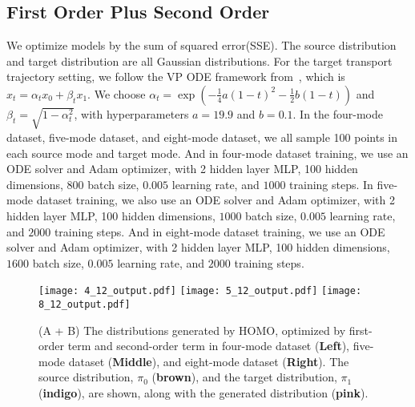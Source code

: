 \subsection{First Order Plus Second Order}\label{sec:app:first_order_plus_second_order}
We optimize models by the sum of squared error(SSE). The source distribution and target distribution are all Gaussian distributions. For the target transport trajectory setting, we follow the VP ODE framework from~\cite{rectified_flow}, which is $x_t = \alpha_t x_0 + \beta_t x_1$. We choose $\alpha_t = \exp(-\frac{1}{4} a(1-t)^2 - \frac{1}{2} b(1-t))$ and $\beta_t = \sqrt{1 - \alpha_t^2}$, with hyperparameters $a = 19.9$ and $b = 0.1$. In the four-mode dataset, five-mode dataset, and eight-mode dataset, we all sample 100 points in each source mode and target mode. And in four-mode dataset training, we use an ODE solver and Adam optimizer, with 2 hidden layer MLP, 100 hidden dimensions, $800$ batch size, $0.005$ learning rate, and $1000$ training steps. In five-mode dataset training, we also use an ODE solver and Adam optimizer, with 2 hidden layer MLP, 100 hidden dimensions, $1000$ batch size, $0.005$ learning rate, and $2000$ training steps. And in eight-mode dataset training, we use an ODE solver and Adam optimizer, with 2 hidden layer MLP, 100 hidden dimensions, $1600$ batch size, $0.005$ learning rate, and $2000$ training steps. 
\begin{figure}[!ht]
\centering
\texttt{[image: 4\_12\_output.pdf]}
\texttt{[image: 5\_12\_output.pdf]}
\texttt{[image: 8\_12\_output.pdf]}
\caption{
(A + B) The distributions generated by HOMO, optimized by first-order term and second-order term in four-mode dataset (\textbf{Left}), five-mode dataset (\textbf{Middle}), and eight-mode dataset (\textbf{Right}). 
The source distribution, $\pi_0$ ({\textbf{brown}}), and the target distribution, $\pi_1$ ({\textbf{indigo}}), are shown, along with the generated distribution ({\textbf{pink}}). 
}
\label{fig:12_distribution}
\end{figure}


